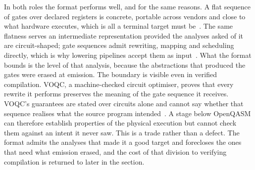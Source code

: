 In both roles the format performs well, and for the same reasons.
A flat sequence of gates over declared registers is concrete, portable across vendors and close to what hardware executes, which is all a terminal target must be~\cite{cross2017openqasm}.
The same flatness serves an intermediate representation provided the analyses asked of it are circuit-shaped; gate sequences admit rewriting, mapping and scheduling directly, which is why lowering pipelines accept them as input~\cite{kulkarni2026openqasm3cudaq}.
What the format bounds is the level of that analysis, because the abstractions that produced the gates were erased at emission.
The boundary is visible even in verified compilation.
VOQC, a machine-checked circuit optimiser, proves that every rewrite it performs preserves the meaning of the gate sequence it receives.
VOQC's guarantees are stated over circuits alone and cannot say whether that sequence realises what the source program intended~\cite{hietala2023voqc}.
A stage below OpenQASM can therefore establish properties of the physical execution but cannot check them against an intent it never saw.
This is a trade rather than a defect.
The format admits the analyses that made it a good target and forecloses the ones that need what emission erased, and the cost of that division to verifying compilation is returned to later in the section.

